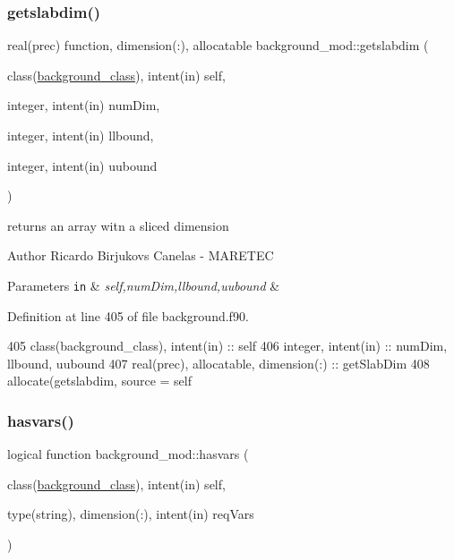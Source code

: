 \subsubsection{\texorpdfstring{getslabdim()}{getslabdim()}}
{\footnotesize\ttfamily real(prec) function, dimension(\+:), allocatable background\+\_\+mod\+::getslabdim (\begin{DoxyParamCaption}\item[{class(\mbox{\hyperlink{structbackground__mod_1_1background__class}{background\+\_\+class}}), intent(in)}]{self,  }\item[{integer, intent(in)}]{num\+Dim,  }\item[{integer, intent(in)}]{llbound,  }\item[{integer, intent(in)}]{uubound }\end{DoxyParamCaption})\hspace{0.3cm}{\ttfamily [private]}}



returns an array witn a sliced dimension 

\begin{DoxyAuthor}{Author}
Ricardo Birjukovs Canelas -\/ M\+A\+R\+E\+T\+EC 
\end{DoxyAuthor}

\begin{DoxyParams}[1]{Parameters}
\mbox{\tt in}  & {\em self,num\+Dim,llbound,uubound} & \\
\hline
\end{DoxyParams}


Definition at line 405 of file background.\+f90.


\begin{DoxyCode}
405     \textcolor{keywordtype}{class}(background\_class), \textcolor{keywordtype}{intent(in)} :: self
406     \textcolor{keywordtype}{integer}, \textcolor{keywordtype}{intent(in)} :: numDim, llbound, uubound
407     \textcolor{keywordtype}{real(prec)}, \textcolor{keywordtype}{allocatable}, \textcolor{keywordtype}{dimension(:)} :: getSlabDim
408     \textcolor{keyword}{allocate}(getslabdim, source = self%
\end{DoxyCode}
\mbox{\label{namespacebackground__mod_aaea077e7c8efb080233831f42e90bd9a}} 
\subsubsection{\texorpdfstring{hasvars()}{hasvars()}}
{\footnotesize\ttfamily logical function background\+\_\+mod\+::hasvars (\begin{DoxyParamCaption}\item[{class(\mbox{\hyperlink{structbackground__mod_1_1background__class}{background\+\_\+class}}), intent(in)}]{self,  }\item[{type(string), dimension(\+:), intent(in)}]{req\+Vars }\end{DoxyParamCaption})\hspace{0.3cm}{\ttfamily [private]}}



